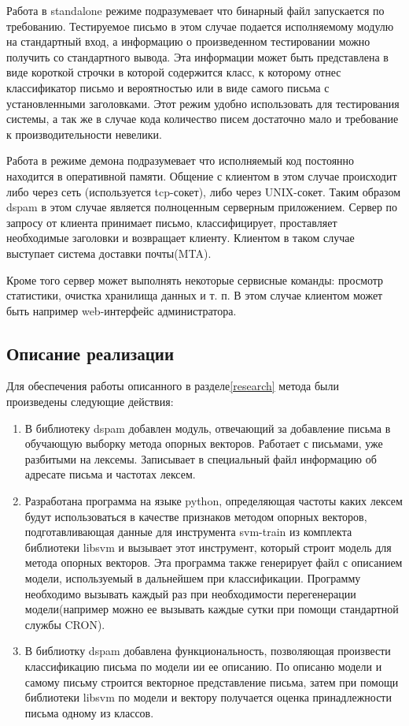 Работа в standalone режиме подразумевает что бинарный файл запускается по требованию. Тестируемое письмо в этом случае подается исполняемому модулю на стандартный вход, а информацию о произведенном тестировании можно
получить со стандартного вывода. Эта информации может быть представлена в виде короткой строчки в которой содержится класс, к которому отнес классификатор письмо и вероятностью или в виде самого письма с установленными заголовками. Этот режим удобно использовать для тестирования системы, а так же в случае кода количество писем достаточно мало и требование к производительности невелики.

Работа в режиме демона подразумевает что исполняемый код постоянно находится в оперативной памяти. Общение с клиентом в этом случае происходит либо через сеть (используется tcp-сокет), либо через UNIX-сокет. Таким образом dspam в этом случае является полноценным серверным приложением. Сервер по запросу от клиента принимает письмо, классифицирует, проставляет необходимые заголовки и возвращает клиенту. Клиентом в таком случае выступает система доставки почты(MTA).

Кроме того сервер может выполнять некоторые сервисные команды: просмотр статистики, очистка хранилища данных и т. п. В этом случае клиентом может быть например web-интерфейс администратора.


\subsection{Описание реализации}
	Для обеспечения работы описанного в разделе\ref{research} метода были произведены следующие действия:
\begin{enumerate}
\item В библиотеку dspam добавлен модуль, отвечающий за добавление письма в обучающую выборку метода опорных векторов. Работает с письмами, уже разбитыми на лексемы. Записывает в специальный файл информацию об адресате письма и частотах лексем.
\item Разработана программа на языке python, определяющая частоты каких лексем будут использоваться в качестве признаков методом опорных векторов, подготавливающая данные для инструмента svm-train из комплекта библиотеки libsvm и вызывает этот инструмент, который строит модель для метода опорных векторов. Эта программа также генерирует файл с описанием модели, используемый в дальнейшем при классификации. Программу необходимо вызывать каждый раз при необходимости перегенерации модели(например можно ее вызывать каждые сутки при помощи стандартной службы CRON).  
\item В библиотку dspam добавлена функциональность, позволяющая произвести классификацию письма по модели ии ее описанию. По описаню модели и самому письму строится векторное представление письма, затем при помощи библиотеки libsvm по модели и вектору получается оценка принадлежности письма одному из классов.
\end{enumerate}

